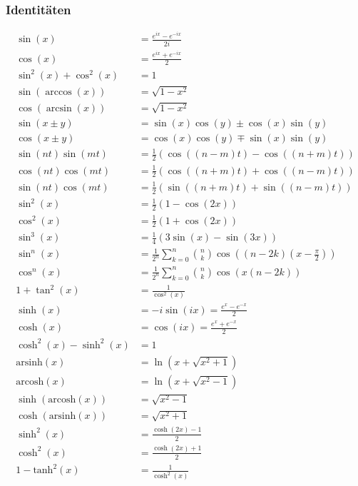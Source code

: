 \documentclass[8pt, a4paper, landscape, fleqn]{scrartcl}
\begin{document}
\begin{multicols*}{3}
				\subsubsection{Identitäten}
					\vspace{-7pt}
					\begin{align*}
						\sin(x)&=\frac{e^{ix}-e^{-ix}}{2i}\\
						\cos(x)&=\frac{e^{ix}+e^{-ix}}{2}\\
						\sin^2(x)+\cos^2(x)&=1\\
						\sin(\arccos(x))&=\sqrt{1-x^2}\\
						\cos(\arcsin(x))&=\sqrt{1-x^2}\\
						\sin(x\pm y)&=\sin(x)\cos(y) \pm \cos(x)\sin(y)\\
						\cos(x \pm y)&=\cos(x)\cos(y) \mp \sin(x)\sin(y)\\
						\sin(nt)\sin(mt)&=\frac{1}{2}(\cos((n-m)t)-\cos((n+m)t))\\
						\cos(nt)\cos(mt)&=\frac{1}{2}(\cos((n+m)t)+\cos((n-m)t))\\
						\sin(nt)\cos(mt)&=\frac{1}{2}(\sin((n+m)t)+\sin((n-m)t))\\
						\sin^2(x)&=\frac{1}{2}(1-\cos(2x))\\
						\cos^2(x)&=\frac{1}{2}(1+\cos(2x))\\
						\sin^3(x)&=\frac{1}{4}(3\sin(x)-\sin(3x))\\
						\sin^n(x)&=\frac{1}{2^n}\sum_{k=0}^{n}\binom{n}{k}\cos\left((n-2k)(x-\frac{\pi}{2})\right)\\
						\cos^n(x)&=\frac{1}{2^n}\sum_{k=0}^{n}\binom{n}{k}\cos\left(x(n-2k)\right)\\
						1+\tan^2(x)&=\frac{1}{\cos^2(x)}\\	
						\sinh(x)&=-i\sin(ix)=\frac{e^x-e^{-x}}{2}\\
						\cosh(x)&=\cos(ix)=\frac{e^x+e^{-x}}{2}\\
						\cosh^2(x)-\sinh^2(x)&=1\\
						\text{arsinh}(x)&=\ln\left(x+\sqrt{x^2+1}\right)\\
						\text{arcosh}(x)&=\ln\left(x+\sqrt{x^2-1}\right)\\
						\sinh(\text{arcosh}(x))&=\sqrt{x^2-1}\\
						\cosh(\text{arsinh}(x))&=\sqrt{x^2+1}\\
						\sinh^2(x)&=\frac{\cosh(2x)-1}{2}\\
						\cosh^2(x)&=\frac{\cosh(2x)+1}{2}\\
						1-\text{tanh}^2(x)&=\frac{1}{\cosh^2(x)}
					\end{align*}

\end{multicols*}
\end{document}
